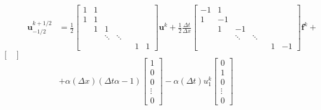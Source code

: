\begin{subequations}
\begin{equation}
\begin{split}
\begin{bmatrix}
            \end{bmatrix}
        \end{split}
    \end{equation}
    \begin{equation}
        \label{eq:neumann_minus_flux}
        \begin{split}
            \mathbf{u}_{-1/2}^{k+1/2}&=\frac{1}{2}
            \begin{bmatrix}
                1 & 1 &        &        & &   &   \\
                1 & 1 &        &        & &   &   \\
                & 1 & 1      &        & &   &   \\
                &   & \ddots & \ddots & &   &   \\
                &   &        &        & & 1 & 1
            \end{bmatrix}\mathbf{u}^k
            +\frac{1}{2}\frac{\Delta t}{\Delta x}
            \begin{bmatrix}
                -1 & 1  &        &        & &   &    \\
                1  & -1 &        &        & &   &    \\
                & 1  & -1     &        & &   &    \\
                &    & \ddots & \ddots & &   &    \\
                &    &        &        & & 1 & -1
            \end{bmatrix}\mathbf{f}^k+\\\\
            &+\alpha(\Delta x)\left( \Delta t \alpha-1 \right)
            \begin{bmatrix}
                1      \\
                0      \\
                0      \\
                \vdots \\
                0
            \end{bmatrix}-\alpha (\Delta t)u_{1}^k
            \begin{bmatrix}
                0      \\
                1      \\
                0      \\
                \vdots \\
                0
            \end{bmatrix}
        \end{split}
    \end{equation}
\end{subequations}

